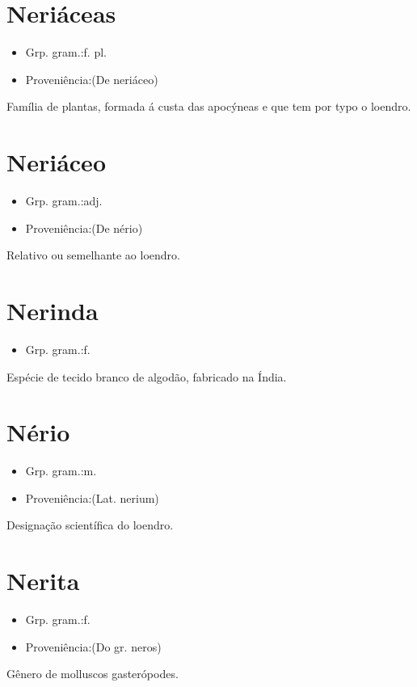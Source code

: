 \section{Neriáceas}
\begin{itemize}
\item {Grp. gram.:f. pl.}
\end{itemize}
\begin{itemize}
\item {Proveniência:(De \textunderscore neriáceo\textunderscore )}
\end{itemize}
Família de plantas, formada á custa das apocýneas e que tem por typo o loendro.
\section{Neriáceo}
\begin{itemize}
\item {Grp. gram.:adj.}
\end{itemize}
\begin{itemize}
\item {Proveniência:(De \textunderscore nério\textunderscore )}
\end{itemize}
Relativo ou semelhante ao loendro.
\section{Nerinda}
\begin{itemize}
\item {Grp. gram.:f.}
\end{itemize}
Espécie de tecido branco de algodão, fabricado na Índia.
\section{Nério}
\begin{itemize}
\item {Grp. gram.:m.}
\end{itemize}
\begin{itemize}
\item {Proveniência:(Lat. \textunderscore nerium\textunderscore )}
\end{itemize}
Designação scientífica do loendro.
\section{Nerita}
\begin{itemize}
\item {Grp. gram.:f.}
\end{itemize}
\begin{itemize}
\item {Proveniência:(Do gr. \textunderscore neros\textunderscore )}
\end{itemize}
Gênero de molluscos gasterópodes.
